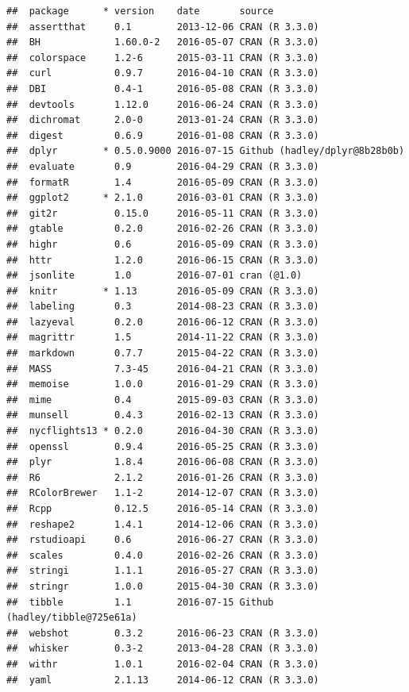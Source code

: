 \documentclass[]{tufte-book}
\begin{document}
\begin{verbatim}
##  package      * version    date       source                        
##  assertthat     0.1        2013-12-06 CRAN (R 3.3.0)                
##  BH             1.60.0-2   2016-05-07 CRAN (R 3.3.0)                
##  colorspace     1.2-6      2015-03-11 CRAN (R 3.3.0)                
##  curl           0.9.7      2016-04-10 CRAN (R 3.3.0)                
##  DBI            0.4-1      2016-05-08 CRAN (R 3.3.0)                
##  devtools       1.12.0     2016-06-24 CRAN (R 3.3.0)                
##  dichromat      2.0-0      2013-01-24 CRAN (R 3.3.0)                
##  digest         0.6.9      2016-01-08 CRAN (R 3.3.0)                
##  dplyr        * 0.5.0.9000 2016-07-15 Github (hadley/dplyr@8b28b0b) 
##  evaluate       0.9        2016-04-29 CRAN (R 3.3.0)                
##  formatR        1.4        2016-05-09 CRAN (R 3.3.0)                
##  ggplot2      * 2.1.0      2016-03-01 CRAN (R 3.3.0)                
##  git2r          0.15.0     2016-05-11 CRAN (R 3.3.0)                
##  gtable         0.2.0      2016-02-26 CRAN (R 3.3.0)                
##  highr          0.6        2016-05-09 CRAN (R 3.3.0)                
##  httr           1.2.0      2016-06-15 CRAN (R 3.3.0)                
##  jsonlite       1.0        2016-07-01 cran (@1.0)                   
##  knitr        * 1.13       2016-05-09 CRAN (R 3.3.0)                
##  labeling       0.3        2014-08-23 CRAN (R 3.3.0)                
##  lazyeval       0.2.0      2016-06-12 CRAN (R 3.3.0)                
##  magrittr       1.5        2014-11-22 CRAN (R 3.3.0)                
##  markdown       0.7.7      2015-04-22 CRAN (R 3.3.0)                
##  MASS           7.3-45     2016-04-21 CRAN (R 3.3.0)                
##  memoise        1.0.0      2016-01-29 CRAN (R 3.3.0)                
##  mime           0.4        2015-09-03 CRAN (R 3.3.0)                
##  munsell        0.4.3      2016-02-13 CRAN (R 3.3.0)                
##  nycflights13 * 0.2.0      2016-04-30 CRAN (R 3.3.0)                
##  openssl        0.9.4      2016-05-25 CRAN (R 3.3.0)                
##  plyr           1.8.4      2016-06-08 CRAN (R 3.3.0)                
##  R6             2.1.2      2016-01-26 CRAN (R 3.3.0)                
##  RColorBrewer   1.1-2      2014-12-07 CRAN (R 3.3.0)                
##  Rcpp           0.12.5     2016-05-14 CRAN (R 3.3.0)                
##  reshape2       1.4.1      2014-12-06 CRAN (R 3.3.0)                
##  rstudioapi     0.6        2016-06-27 CRAN (R 3.3.0)                
##  scales         0.4.0      2016-02-26 CRAN (R 3.3.0)                
##  stringi        1.1.1      2016-05-27 CRAN (R 3.3.0)                
##  stringr        1.0.0      2015-04-30 CRAN (R 3.3.0)                
##  tibble         1.1        2016-07-15 Github (hadley/tibble@725e61a)
##  webshot        0.3.2      2016-06-23 CRAN (R 3.3.0)                
##  whisker        0.3-2      2013-04-28 CRAN (R 3.3.0)                
##  withr          1.0.1      2016-02-04 CRAN (R 3.3.0)                
##  yaml           2.1.13     2014-06-12 CRAN (R 3.3.0)
\end{verbatim}
\end{document}
